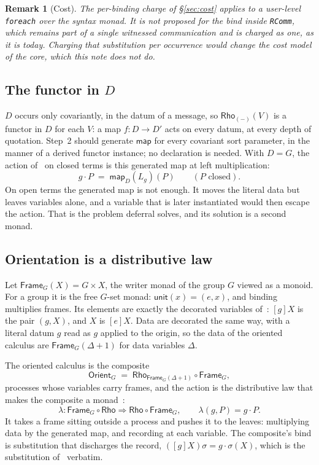 \documentclass[11pt]{article}
\theoremstyle{branddef}
\theoremstyle{brandplain}
\theoremstyle{brandrem}
\newtheorem{remark}[definition]{Remark}
\newcommand{\unit}{\mathsf{unit}}
\newcommand{\fmap}{\mathsf{map}}
\newcommand{\fe}{\texttt{foreach}}
\begin{document}
\begin{remark}[Cost]
The per-binding charge of \S\ref{sec:cost} applies to a user-level \fe{} over
the syntax monad. It is not proposed for the bind inside \texttt{RComm}, which
remains part of a single witnessed communication and is charged as one, as it
is today. Charging that substitution per occurrence would change the cost model
of the core, which this note does not do.
\end{remark}

\subsection{The functor in \texorpdfstring{\(D\)}{D}}

\(D\) occurs only covariantly, in the datum of a message, so
\(\mathsf{Rho}_{(-)}(V)\) is a functor in \(D\) for each \(V\): a map
\(f : D\to D'\) acts on every datum, at every depth of quotation. Step~2 should
generate \(\fmap\) for every covariant sort parameter, in the manner of a
derived functor instance; no declaration is needed. With \(D=G\), the action
of~\cite{Oriented} on closed terms is this generated map at left
multiplication:
\[
g\cdot P \;=\; \fmap_D(L_g)(P) \qquad (P \text{ closed}).
\]
On open terms the generated map is not enough. It moves the literal data but
leaves variables alone, and a variable that is later instantiated would then
escape the action. That is the problem deferral solves, and its solution is a
second monad.

\subsection{Orientation is a distributive law}

Let \(\mathsf{Frame}_G(X) = G\times X\), the writer monad of the group \(G\)
viewed as a monoid. For a group it is the free \(G\)-set monad: \(\unit(x) =
(e, x)\), and binding multiplies frames. Its elements are exactly the decorated
variables of~\cite{Oriented}: \([g]X\) is the pair \((g, X)\), and \(X\) is
\([e]X\). Data are decorated the same way, with a literal datum \(g\) read as
\(g\) applied to the origin, so the data of the oriented calculus are
\(\mathsf{Frame}_G(\Delta + 1)\) for data variables \(\Delta\).

The oriented calculus is the composite
\[
\mathsf{Orient}_G \;=\; \mathsf{Rho}_{\mathsf{Frame}_G(\Delta+1)} \circ \mathsf{Frame}_G ,
\]
processes whose variables carry frames, and the action is the distributive
law that makes the composite a monad~\cite{Beck69}:
\[
\lambda : \mathsf{Frame}_G\circ\mathsf{Rho} \Rightarrow
\mathsf{Rho}\circ\mathsf{Frame}_G,
\qquad
\lambda(g, P) = g\cdot P .
\]
It takes a frame sitting outside a process and pushes it to the leaves:
multiplying data by the generated map, and recording at each variable. The
composite's bind is substitution that discharges the record,
\(([g]X)\sigma = g\cdot\sigma(X)\), which is the substitution
of~\cite{Oriented} verbatim.
\end{document}
